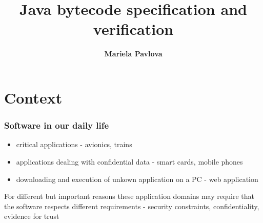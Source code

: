 \documentclass{beamer}
\title[Phd defense]{Java bytecode specification and verification}
\author[mariela.pavlova@sophia.inria.fr]{\textbf{Mariela Pavlova}}
\date[Phd defense]{}
\begin{document}
\begin{frame}
\titlepage
\end{frame}





\newcommand{\wpi}{\mbox{\rm\textit{wp}}}%
\newcommand{\Pred}{\mbox{\rm\texttt{Pred}}}
\newcommand{\program}{\mbox{\rm\texttt{P}}}%
\newcommand{\Method}{\mbox{\rm\texttt{Method}}}%
\newcommand{\methodd}{\mbox{\rm\textsf{meth}}}

%    



\section{Context}
\begin{frame}[shrink]
\frametitle{Software in our daily life}
  \begin{itemize}
     \item critical applications - avionics, trains
       \item applications dealing with confidential data - smart cards, mobile phones
        \item   downloading and execution of unkown application on a PC - web application  
\end{itemize}
 
 For different but important reasons these application domains may
 require that the software  respects different requirements - security constraints,
 confidentiality, evidence  for trust

  
\end{frame}
\end{document}

